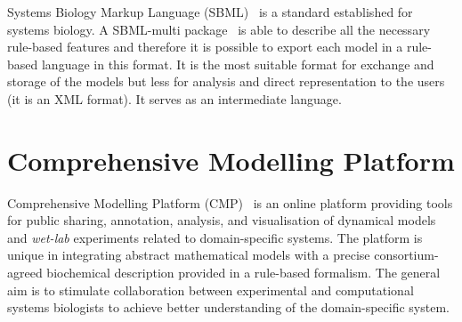 \documentclass[12pt, twoside]{fithesis2} %
\begin{document}
Systems Biology Markup Language (SBML)~\cite{hucka2003systems} is a standard established for systems biology. A SBML-multi package~\cite{zhang2015sbml} is able to describe all the necessary rule-based features and therefore it is possible to export each model in a rule-based language in this format. It is the most suitable format for exchange and storage of the models but less for analysis and direct representation to the users (it is an XML format). It serves as an intermediate language.

\section{Comprehensive Modelling Platform}
\label{cmp}

Comprehensive Modelling Platform (CMP)~\cite{cs2bio2013} is an online platform providing tools for public sharing, annotation, analysis, and visualisation of dynamical models and \emph{wet-lab} experiments related to domain-specific systems. The platform is unique in integrating abstract mathematical models with a precise consortium-agreed biochemical description provided in a rule-based formalism. The general aim is to stimulate collaboration between experimental and computational systems biologists to achieve better understanding of the domain-specific system.
\end{document}

